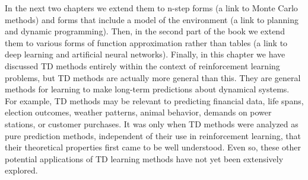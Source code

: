 In the next two chapters we extend them to n-step forms (a link to Monte Carlo methods) and forms
that include a model of the environment (a link to planning and dynamic programming).
Then, in the second part of the book we extend them to various forms of function approximation
rather than tables (a link to deep learning and artificial neural networks).
Finally, in this chapter we have discussed TD methods entirely within the context of
reinforcement learning problems, but TD methods are actually more general than this.
They are general methods for learning to make long-term predictions about dynamical systems.
For example, TD methods may be relevant to predicting financial data, life spans, election outcomes,
weather patterns, animal behavior, demands on power stations, or customer purchases.
It was only when TD methods were analyzed as pure prediction methods, independent of their use in
reinforcement learning, that their theoretical properties first came to be well understood.
Even so, these other potential applications of TD learning methods have not yet been extensively
explored.
